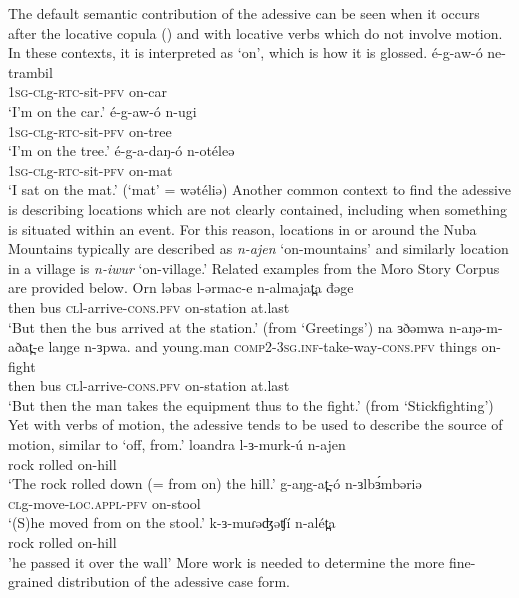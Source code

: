 The default semantic contribution of the adessive can be seen when it occurs after the locative copula () and with locative verbs which do not involve motion. In these contexts, it is interpreted as `on', which is how it is glossed.
\ea \ea \gll é-g-aw-ó ne-trambil \\
		 	\textsc{1sg-}\textsc{cl}g-\textsc{rtc-}sit-\textsc{pfv} on-car\\
		\glt `I'm on the car.' 
	\ex \gll é-g-aw-ó n-ugi \\
		 	\textsc{1sg-}\textsc{cl}g-\textsc{rtc-}sit-\textsc{pfv} on-tree\\
		\glt `I'm on the tree.' 
     \ex \gll é-g-a-daŋ-ó n-otéleə		\\	
			\textsc{1sg-}\textsc{cl}g-\textsc{rtc-}sit-\textsc{pfv} on-mat \\
		\glt `I sat on the mat.' (`mat' = wətéliə)
	\z 
\z
Another common context to find the adessive is describing locations which are not clearly contained, including when something is situated within an event. For this reason, locations in or around the Nuba Mountains typically are described as \textit{n-ajen} `on-mountains' and similarly location in a village is \textit{n-iwur} `on-village.' Related examples from the Moro Story Corpus are provided below.
\ea \ea \gll Orn lǝbas l-ǝrmac-e n-almajat̪a đǝge\\
		then bus \textsc{cl}l-arrive-\textsc{cons.pfv} on-station at.last\\
	\glt `But then the bus arrived at the station.' \hfill (from `Greetings')
	\ex \gll na ɜðəmwa n-aŋə-m-aðat̪-e laŋge n-ɜpwa.
			and young.man \textsc{comp2-}\textsc{3sg.inf-}take-way-\textsc{cons.pfv} things on-fight\\
		then bus \textsc{cl}l-arrive-\textsc{cons.pfv} on-station at.last\\
	\glt `But then the man takes the equipment thus to the fight.' \hfill (from `Stickfighting')
	\z 
\z
Yet with verbs of motion, the adessive tends to be used to describe the source of motion, similar to `off, from.'  
\ea 
	\ea \gll loandra l-ɜ-murk-ú n-ajen		 \\
			rock rolled on-hill  \\
		\glt `The rock rolled down (= from on) the hill.'
	\ex \gll g-aŋg-at̪-ó n-ɜlbɜ́mbəriə	\\	
			\textsc{cl}g-move-\textsc{loc.appl-}\textsc{pfv} on-stool\\
	\glt 	`(S)he moved from on the stool.'	%
	\ex	\gll 	k-ɜ-muɾəʤəʧí n-alét̪a	\\
				rock rolled on-hill\\
		\glt 	'he passed it over the wall'
	\z
\z 
More work is needed to determine the more fine-grained distribution of the adessive case form.

